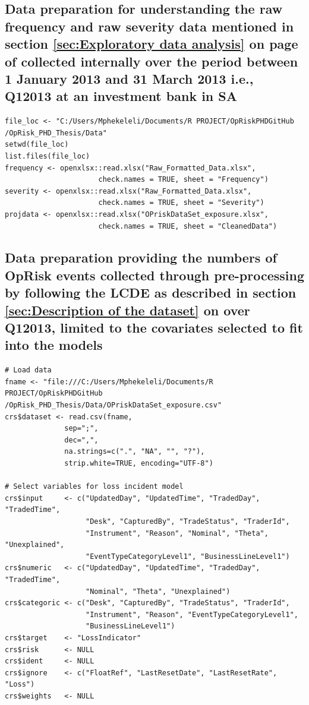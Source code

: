 \documentclass{DissertateUSU}
\begin{document}
\normalsize

\subsection{Data preparation for understanding the raw frequency and raw severity data mentioned in
section \ref{sec:Exploratory data analysis} on page \pageref{sec:Exploratory data analysis} of collected internally over the period
between 1 January 2013 and 31 March 2013 i.e., Q12013 at an investment bank in SA}
\label{ssec:Data preparation raw}

\small

\begin{verbatim}
file_loc <- "C:/Users/Mphekeleli/Documents/R PROJECT/OpRiskPHDGitHub
/OpRisk_PHD_Thesis/Data"
setwd(file_loc)
list.files(file_loc)
frequency <- openxlsx::read.xlsx("Raw_Formatted_Data.xlsx",
                      check.names = TRUE, sheet = "Frequency")
severity <- openxlsx::read.xlsx("Raw_Formatted_Data.xlsx",
                      check.names = TRUE, sheet = "Severity")
projdata <- openxlsx::read.xlsx("OPriskDataSet_exposure.xlsx",
                      check.names = TRUE, sheet = "CleanedData")
\end{verbatim}

\normalsize

\subsection{Data preparation providing the numbers of OpRisk events collected through pre-processing by following the LCDE as described in section \ref{sec:Description of the dataset} on \pageref{sec:Description of the dataset} over Q12013, limited to the covariates selected to fit into the models}
\label{ssec:Data preparation pre-processed}

\small

\begin{verbatim}
# Load data
fname <- "file:///C:/Users/Mphekeleli/Documents/R PROJECT/OpRiskPHDGitHub
/OpRisk_PHD_Thesis/Data/OPriskDataSet_exposure.csv"
crs$dataset <- read.csv(fname,
              sep=";",
              dec=",",
              na.strings=c(".", "NA", "", "?"),
              strip.white=TRUE, encoding="UTF-8")

# Select variables for loss incident model
crs$input     <- c("UpdatedDay", "UpdatedTime", "TradedDay", "TradedTime",
                   "Desk", "CapturedBy", "TradeStatus", "TraderId",
                   "Instrument", "Reason", "Nominal", "Theta", "Unexplained",
                   "EventTypeCategoryLevel1", "BusinessLineLevel1")
crs$numeric   <- c("UpdatedDay", "UpdatedTime", "TradedDay", "TradedTime",
                   "Nominal", "Theta", "Unexplained")
crs$categoric <- c("Desk", "CapturedBy", "TradeStatus", "TraderId",
                   "Instrument", "Reason", "EventTypeCategoryLevel1",
                   "BusinessLineLevel1")
crs$target    <- "LossIndicator"
crs$risk      <- NULL
crs$ident     <- NULL
crs$ignore    <- c("FloatRef", "LastResetDate", "LastResetRate", "Loss")
crs$weights   <- NULL
\end{verbatim}
\end{document}
